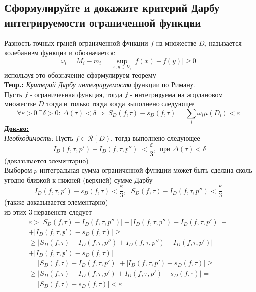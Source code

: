 
\subsection{Сформулируйте и докажите критерий Дарбу интегрируемости ограниченной функции}

Разность точных граней ограниченной функции $f$ на множестве $D_i$ называется колебанием функции и обозначается:
\[\omega_i = M_i - m_i = \sup_{x,y\in D_i}{|f(x) - f(y)|} \geq 0\]
используя это обозначение сформулируем теорему\\
\textbf{\underline{Теор.:} } \textit{Критерий Дарбу интегрируемости} функции по Риману. \\
Пусть $f$ - ограниченная функция, тогда $f$ - интегрируема на жордановом множестве $D$ тогда и только тогда когда выполнено следующее
\[\forall \varepsilon > 0 \ \exists \delta > 0: \ \Delta(\tau) < \delta \Rightarrow \ S_D(f, \tau) - s_D(f, \tau) = \sum\limits_i\omega_i\mu(D_i) < \varepsilon\]
\textbf{\underline{Док-во:} } \\
\textit{Необходимость: }Пусть $f \in \mathcal{R}(D)$, тогда выполнено следующее
\[|I_D(f, \tau, p') - I_D(f, \tau, p'')| < \frac{\varepsilon}{3}, \ \ \text{при } \Delta(\tau) < \delta\]
(доказывается элементарно) \\
Выбором $p$ интегральная сумма ограниченной функции может быть сделана сколь угодно близкой к нижней (верхней) сумме Дарбу
\[I_D(f, \tau, p') - s_D(f, \tau) < \frac{\varepsilon}{3}, \ \ \ S_D(f, \tau) - I_D(f, \tau, p'') < \frac{\varepsilon}{3}\]
(также доказывается элементарно) \\
из этих 3 неравенств следует
\begin{multline*}
    \varepsilon > |S_D(f, \tau) - I_D(f, \tau, p'')| + |I_D(f, \tau, p'') - I_D(f, \tau, p')| + \\ + |I_D(f, \tau, p') - s_D(f, \tau)| \geq \\ \geq |S_D(f, \tau) - I_D(f, \tau, p'') + I_D(f, \tau, p'') - I_D(f, \tau, p')| + \\ + |I_D(f, \tau, p') - s_D(f, \tau)| = \\ = |S_D(f, \tau) - I_D(f, \tau, p')| + |I_D(f, \tau, p') - s_D(f, \tau)| \geq \\ \geq |S_D(f, \tau) - I_D(f, \tau, p') + I_D(f, \tau, p') - s_D(f, \tau)| = \\ = |S_D(f, \tau) - s_D(f, \tau)| < \varepsilon
\end{multline*}
